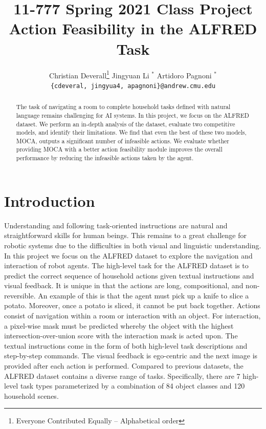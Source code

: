 \documentclass[11pt,a4paper]{article}
\title{11-777 Spring 2021 Class Project\\
Action Feasibility in the ALFRED Task}
\author{
  Christian Deverall\thanks{\hspace{4pt}Everyone Contributed Equally -- Alphabetical order} \hspace{2em} Jingyuan Li $^*$ \hspace{2em} Artidoro Pagnoni $^*$ \\
  \texttt{\{cdeveral, jingyua4, apagnoni\}@andrew.cmu.edu}
  }
\date{}
\begin{document}
\maketitle

\begin{abstract}
    The task of navigating a room to complete household tasks defined with natural language remains challenging for AI systems. In this project, we focus on the ALFRED dataset. We perform an in-depth analysis of the dataset, evaluate two competitive models, and identify their limitations. We find that even the best of these two models, MOCA, outputs a significant number of infeasible actions. We evaluate whether providing MOCA with a better action feasibility module improves the overall performance by reducing the infeasible actions taken by the agent.
\end{abstract}

\section{Introduction}
Understanding and following task-oriented instructions are natural and straightforward skills for human beings. This remains to a great challenge for robotic systems due to the difficulties in both visual and linguistic understanding. In this project we focus on the ALFRED dataset \cite{ALFRED20} to explore the navigation and interaction of robot agents. The high-level task for the ALFRED dataset is to predict the correct sequence of household actions given textual instructions and visual feedback. It is unique in that the actions are long, compositional, and non-reversible. An example of this is that the agent must pick up a knife to slice a potato. Moreover, once a potato is sliced, it cannot be put back together. Actions consist of navigation within a room or interaction with an object. For interaction, a pixel-wise mask must be predicted whereby the object with the highest intersection-over-union score with the interaction mask is acted upon. The textual instructions come in the form of both high-level task descriptions and step-by-step commands. The visual feedback is ego-centric and the next image is provided after each action is performed. Compared to previous datasets, the ALFRED dataset contains a diverse range of tasks. Specifically, there are 7 high-level task types parameterized by a combination of 84 object classes and 120 household scenes.
\end{document}
